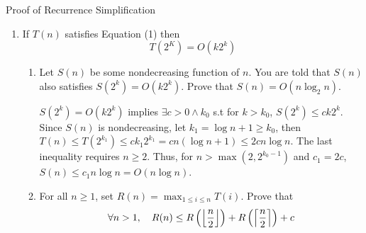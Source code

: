 \documentclass{article}
\begin{document}
\begin{section}{Proof of Recurrence Simplification}
\begin{enumerate}
\begin{enumerate}[(i)]
        Since $R(n) = \max_{1 \leq i \leq n} T(i)$ we have $T(n) \leq R(n)$ for all $n$. Combining with equation (2), we have:
        \begin{align*}
            T(i) &\leq T\left(\floor*{\frac{i}{3}}\right) + c \leq  R\left(\floor*{\frac{i}{3}}\right) + c \\
            R(n) = \max_{1 \leq i \leq n} T(i) &\leq \max_{1 \leq i \leq n} R\left(\floor*{\frac{i}{3}}\right) + c \leq R\left(\floor*{\frac{n}{3}}\right) + c
        \end{align*}
        note that the last inequality holds due to the fact that $R(i)$ is a nondecreasing function.
        
        \item Using (i), (ii), and (iii), prove that if $T(n)$ satisfies Equation (2) then $T(n) = O(\log n)$
        
        First, note that $\forall n \geq  2, T(n) \leq R(n)$. Then, from (iii) and (i), we know that the upper bound of $T(n)$, which is $R(n)$ is a nondecreasing function and also upperbounded by $R(3^k) = O(k)$. Combining with the result from (ii). we proved that $R(n) = O(\log_3 n)$. Since $\forall n \geq 2, T(n) \leq R(n)$, $T(n) = O(\log_2 n)$. (QED)
    \end{enumerate}
    
    \item If $T(n)$ satisfies Equation (1) then 
    \begin{equation}
        T(2^K) = O(k2^k)
    \end{equation}
    \begin{enumerate}
        \item Let $S(n)$ be some nondecreasing function of $n$. You are told that $S(n)$ also satisfies $S(2^k) = O(k2^k)$. Prove that $S(n) = O(n\log_2 n)$.
        
        \smallskip
        $S(2^k) = O(k2^k)$ implies $\exists c > 0 \land k_0$ s.t for $k > k_0$, $S(2^k) \leq ck2^k$. Since $S(n)$ is nondecreasing, let $k_1 = \log n + 1 \geq k_0$, then $T(n) \leq T(2^{k_1}) \leq c k_1 2^{k_1} = c n (\log n  + 1) \leq 2c n \log n$. The last inequality requires $n \geq 2$. Thus, for $n > \max(2, 2^{k_0 - 1})$ and $c_1 = 2c$, $S(n) \leq c_1 n \log n = O(n \log n)$.
        
        
        \item For all $n \geq 1$, set $R(n) = \max_{1 \leq i \leq n} T(i)$. Prove that
        \begin{equation*}
            \forall n > 1, \quad R(n) \leq R\pbracket{\floor*{\frac{n}{2}}} + R\pbracket{\ceil*{\frac{n}{2}}} + c 
        \end{equation*}
        

\end{enumerate}
\end{enumerate}
\end{section}
\end{document}
